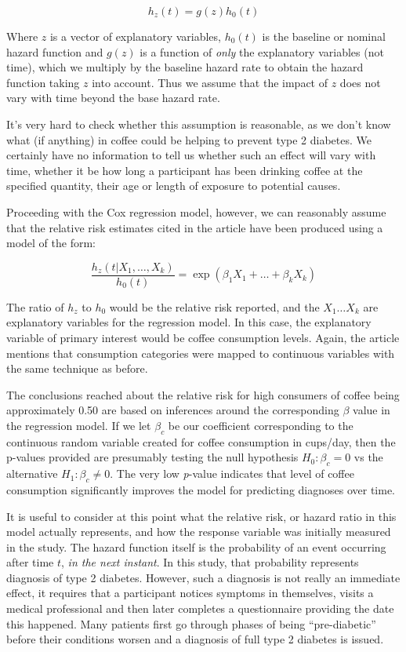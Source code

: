 \documentclass{article}
\begin{document}
\begin{equation}
h_{z}(t) = g(z)h_{0}(t)
\end{equation}

Where \(z\) is a vector of explanatory variables, \(h_{0}(t)\) is the
baseline or nominal hazard function and \(g(z)\) is a function of
\emph{only} the explanatory variables (not time), which we multiply by
the baseline hazard rate to obtain the hazard function taking \(z\)
into account. Thus we assume that the impact of \(z\) does not vary
with time beyond the base hazard rate.

It's very hard to check whether this assumption is reasonable, as we
don't know what (if anything) in coffee could be helping to prevent
type 2 diabetes. We certainly have no information to tell us whether
such an effect will vary with time, whether it be how long a
participant has been drinking coffee at the specified quantity, their
age or length of exposure to potential causes.

Proceeding with the Cox regression model, however, we can reasonably
assume that the relative risk estimates cited in the article have been
produced using a model of the form:

\begin{equation}
\frac{h_{z}(t | X_1, \ldots, X_k)}{h_0(t)} = \exp(\beta_1 X_1 + \ldots +
\beta_k X_k)
\end{equation}

The ratio of \(h_z\) to \(h_0\) would be the relative risk reported,
and the \(X_1 \ldots X_k\) are explanatory variables for the
regression model. In this case, the explanatory variable of primary
interest would be coffee consumption levels. Again, the article
mentions that consumption categories were mapped to continuous
variables with the same technique as before.

The conclusions reached about the relative risk for high consumers of
coffee being approximately 0.50 are based on inferences around the
corresponding \(\beta\) value in the regression model. If we let
\(\beta_c\) be our coefficient corresponding to the continuous random
variable created for coffee consumption in cups/day, then the p-values
provided are presumably testing the null hypothesis \(H_0: \beta_c = 0
\) vs the alternative \(H_1: \beta_c \neq 0\). The very low \textit{p}-value
indicates that level of coffee consumption significantly improves the
model for predicting diagnoses over time.

It is useful to consider at this point what the relative risk, or
hazard ratio in this model actually represents, and how the response
variable was initially measured in the study. The hazard function
itself is the probability of an event occurring after time \(t\),
\emph{in the next instant}. In this study, that probability represents
diagnosis of type 2 diabetes. However, such a diagnosis is not really
an immediate effect, it requires that a participant notices symptoms
in themselves, visits a medical professional and then later completes
a questionnaire providing the date this happened. Many patients first
go through phases of being ``pre-diabetic'' before their conditions
worsen and a diagnosis of full type 2 diabetes is issued.
\end{document}
